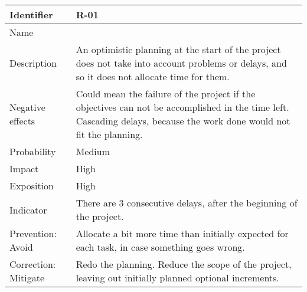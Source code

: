 \begin{table}[H]
	\begin{tabularx}{\textwidth}{|y|z|}
		\hline
		Identifier & \textbf{R-01} \\ \hline
		Name & \Runo \\ \hline
		Description &
			An optimistic planning at the start of the project does not take into account problems or delays, and so it does not allocate time for them.
		\\ \hline
		Negative effects &
			Could mean the failure of the project if the objectives can not be accomplished in the time left. \linej
			Cascading delays, because the work done would not fit the planning.
		\\ \hline
		Probability & Medium\\ \hline
		Impact &  High\\ \hline
		Exposition &  High\\ \hline
		Indicator & There are 3 consecutive delays, after the beginning of the project.\\ \hline
		Prevention: Avoid &
			Allocate a bit more time than initially expected for each task, in case something goes wrong.
		\\ \hline
		Correction: Mitigate &
			Redo the planning. \linej
			Reduce the scope of the project, leaving out initially planned optional increments.
		\\ \hline
	\end{tabularx}
\end{table}


